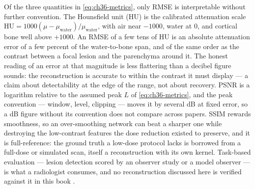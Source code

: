 Of the three quantities in \eqref{eq:ch36-metrics}, only RMSE is interpretable
without further
convention. The Hounsfield unit (HU) is the
calibrated attenuation scale $\mathrm{HU}=1000(\mu-\mu_{\text{water}})/\mu_{\text{water}}$,
with air near $-1000$, water at $0$, and cortical bone well above
$+1000$. An RMSE of a few tens of HU is an absolute attenuation error of a few
percent of the water-to-bone span, and of the same order as the contrast between
a focal lesion and the parenchyma around it. The honest reading of an error at
that magnitude is less
flattering than a decibel figure sounds: the reconstruction is accurate to
within the contrast it must display --- a claim about detectability at the edge
of the range, not about recovery.
PSNR is a logarithm relative to the assumed peak $L$ of
\eqref{eq:ch36-metrics}, and the peak convention
--- window, level, clipping --- moves it by several dB at fixed error, so a dB
figure without its convention does not compare across papers.
SSIM rewards smoothness, so an over-smoothing network can
beat a sharper one while destroying the low-contrast features the dose reduction
existed to preserve, and it is full-reference: the ground truth a low-dose
protocol lacks is borrowed from a full-dose or simulated scan, itself a
reconstruction with its own kernel. Task-based evaluation --- lesion detection
scored by an observer study or a model observer --- is what a radiologist
consumes, and no reconstruction discussed here is verified against it in this
book
.

